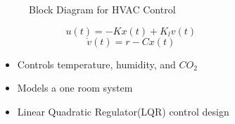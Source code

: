 \documentclass[final]{beamer}
\newlength{\sepwid}
\newlength{\onecolwid}
\begin{document}
\begin{frame}[t]
\begin{columns}[t]
\begin{column}{\onecolwid}
\begin{figure}
    \centering
    \label{fig:subsystem}
    \caption{Block Diagram for HVAC Control}
\end{figure}

\begin{equation}
    u(t) = -Kx(t) + K_lv(t)
\end{equation}
\begin{equation}
    \Dot{v}(t) = r - Cx(t)
\end{equation}
\begin{itemize}
    \item Controls temperature, humidity, and $CO_2$
    \item Models a one room system
    \item Linear Quadratic Regulator(LQR) control design
\end{itemize}

\end{column} %

\begin{column}{\sepwid}\end{column}

\begin{column}{\onecolwid} %




\end{column}
\end{columns}
\end{frame}
\end{document}
